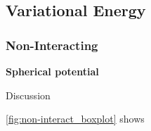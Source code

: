 \subsection{Variational Energy}

\subsubsection{Non-Interacting}

\textbf{Spherical potential}

Discussion

\autoref{fig:non-interact_boxplot} shows 

